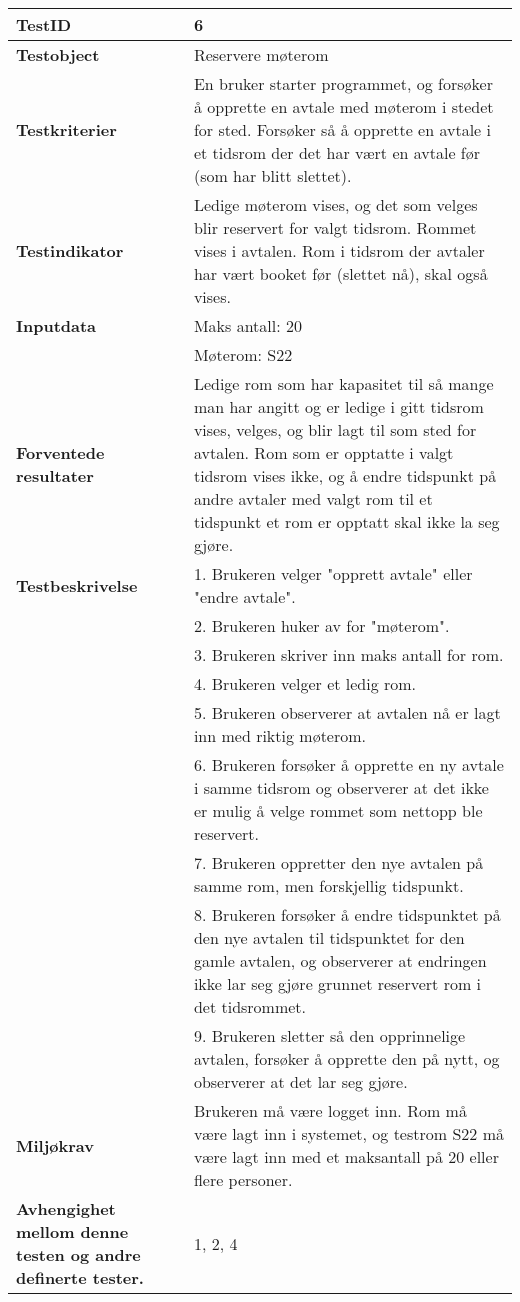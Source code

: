 	\begin{tabularx}{1.2\textwidth}{| p{5cm} | X |}
	\hline
	\textbf{TestID} 																& 6																	\\ \hline
	\textbf{Testobject} 															& Reservere møterom													\\ \hline
	\textbf{Testkriterier} 															& En bruker starter programmet, og forsøker å opprette en avtale med møterom i stedet for sted. Forsøker så å opprette en avtale i et tidsrom der det har vært en avtale før (som har blitt slettet).						\\ \hline
	\textbf{Testindikator} 															& Ledige møterom vises, og det som velges blir reservert for valgt tidsrom. Rommet vises i avtalen. Rom i tidsrom der avtaler har vært booket før (slettet nå), skal også vises.													\\ \hline
	\textbf{Inputdata} 															& Maks antall: 20													\\ 
																			& Møterom: S22														\\  \hline
	\textbf{Forventede resultater}									 				&Ledige rom som har kapasitet til så mange man har angitt og er ledige i gitt tidsrom vises, velges, og blir lagt til som sted for avtalen. Rom som er opptatte i valgt tidsrom vises ikke, og å endre tidspunkt på andre avtaler med valgt rom til et tidspunkt et rom er opptatt skal ikke la seg gjøre.				\\ \hline
	\textbf{Testbeskrivelse} 														& 1. Brukeren velger "opprett avtale" eller "endre avtale".\\
																			& 2. Brukeren huker av for "møterom".\\
																			& 3. Brukeren skriver inn maks antall for rom.\\
																			& 4. Brukeren velger et ledig rom.\\
																			& 5. Brukeren observerer at avtalen nå er lagt inn med riktig møterom.\\
																			& 6. Brukeren forsøker å opprette en ny avtale i samme tidsrom og observerer at det ikke er mulig å velge rommet som nettopp ble reservert.\\
																			& 7. Brukeren oppretter den nye avtalen på samme rom, men forskjellig tidspunkt.\\
																			& 8. Brukeren forsøker å endre tidspunktet på den nye avtalen til tidspunktet for den gamle avtalen, og observerer at endringen ikke lar seg gjøre grunnet reservert rom i det tidsrommet.\\
																			& 9. Brukeren sletter så den opprinnelige avtalen, forsøker å opprette den på nytt, og observerer at det lar seg gjøre.					\\ \hline
	\textbf{Miljøkrav}			 												& Brukeren må være logget inn. Rom må være lagt inn i systemet, og testrom S22 må være lagt inn med et maksantall på 20 eller flere personer.						\\ \hline
	\textbf{Avhengighet mellom denne testen og andre definerte tester.}		 				& 1, 2, 4				 													\\ \hline
	\end{tabularx}


